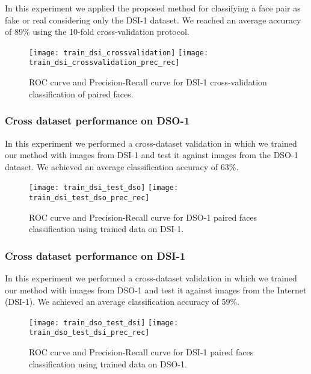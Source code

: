 In this experiment we applied the proposed method for classifying a face pair as fake or real considering only the DSI-1 dataset. We reached an average accuracy of 89\% using the 10-fold cross-validation protocol.

\begin{figure}[!htb]
  \texttt{[image: train\_dsi\_crossvalidation]}
\endminipage\hfill
{}
  \texttt{[image: train\_dsi\_crossvalidation\_prec\_rec]}
\endminipage
\caption{ROC curve and Precision-Recall curve for DSI-1 cross-validation classification of paired faces.}\label{fig:regiondetnormal}
\end{figure}

\subsubsection{Cross dataset performance on DSO-1}

In this experiment we performed a cross-dataset validation in which we trained our method with images from DSI-1 and test it against images from the DSO-1 dataset. We achieved an average classification accuracy of 63\%. 

\begin{figure}[!htb]
  \texttt{[image: train\_dsi\_test\_dso]}
\endminipage\hfill
{}
  \texttt{[image: train\_dsi\_test\_dso\_prec\_rec]}
\endminipage
\caption{ROC curve and Precision-Recall curve for DSO-1 paired faces classification using trained data on DSI-1.}\label{fig:regiondetnormal}
\end{figure}

\subsubsection{Cross dataset performance on DSI-1}

In this experiment we performed a cross-dataset validation in which we trained our method with images from DSO-1 and test it against images from the Internet (DSI-1). We achieved an average classification accuracy of 59\%. 

\begin{figure}[!htb]
  \texttt{[image: train\_dso\_test\_dsi]}
\endminipage\hfill
{}
  \texttt{[image: train\_dso\_test\_dsi\_prec\_rec]}
\endminipage
\caption{ROC curve and Precision-Recall curve for DSI-1 paired faces classification using trained data on DSO-1.}\label{fig:regiondetnormal}
\end{figure}

